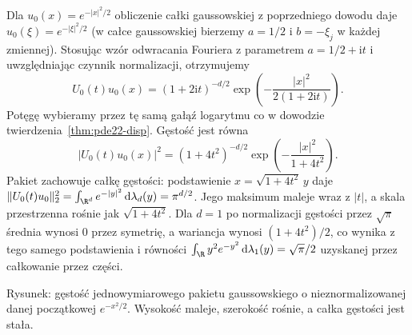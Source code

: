 \begin{przyklad}
Dla $u_0(x)=e^{-|x|^2/2}$ obliczenie całki
gaussowskiej z poprzedniego dowodu daje
$\widehat u_0(\xi)=e^{-|\xi|^2/2}$
(w całce gaussowskiej bierzemy $a=1/2$ i
$b=-\xi_j$ w każdej zmiennej).
Stosując wzór odwracania Fouriera z parametrem
$a=1/2+\mathrm it$ i uwzględniając czynnik
normalizacji, otrzymujemy
\[
 U_0(t)u_0(x)=(1+2\mathrm it)^{-d/2}
 \exp\!\left(-\frac{|x|^2}{2(1+2\mathrm it)}\right).
\]
Potęgę wybieramy przez tę samą gałąź
logarytmu co w dowodzie twierdzenia~\ref{thm:pde22-disp}.
Gęstość jest równa
\[
 |U_0(t)u_0(x)|^2
 =(1+4t^2)^{-d/2}\exp\!\left(-\frac{|x|^2}{1+4t^2}\right).
\]
Pakiet zachowuje całkę gęstości:
podstawienie $x=\sqrt{1+4t^2}\,y$ daje
$\|U_0(t)u_0\|_2^2=\int_{\R^d}e^{-|y|^2}\,
\mathrm d\lambda_d(y)=\pi^{d/2}$.
Jego maksimum maleje wraz z $|t|$, a skala
przestrzenna rośnie jak $\sqrt{1+4t^2}$.
Dla $d=1$ po normalizacji gęstości przez
$\sqrt{\pi}$ średnia wynosi $0$ przez symetrię,
a wariancja wynosi $(1+4t^2)/2$,
co wynika z tego samego podstawienia i równości
$\int_\R y^2e^{-y^2}\,\mathrm d\lambda_1(y)=\sqrt\pi/2$
uzyskanej przez całkowanie przez części.
\end{przyklad}

\begin{center}

\small Rysunek: gęstość jednowymiarowego pakietu gaussowskiego
o nieznormalizowanej danej początkowej $e^{-x^2/2}$.
Wysokość maleje, szerokość rośnie, a całka gęstości jest stała.
\end{center}

